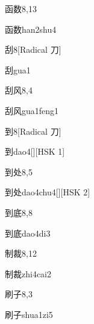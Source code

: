 \begin{entry}{函数}{8,13}
  \begin{phonetics}{函数}{han2shu4}
  \end{phonetics}
\end{entry}

\begin{entry}{刮}{8}[Radical 刀]
  \begin{phonetics}{刮}{gua1}
  \end{phonetics}
\end{entry}

\begin{entry}{刮风}{8,4}
  \begin{phonetics}{刮风}{gua1feng1}
  \end{phonetics}
\end{entry}

\begin{entry}{到}{8}[Radical 刀]
  \begin{phonetics}{到}{dao4}[][HSK 1]
  \end{phonetics}
\end{entry}

\begin{entry}{到处}{8,5}
  \begin{phonetics}{到处}{dao4chu4}[][HSK 2]
  \end{phonetics}
\end{entry}

\begin{entry}{到底}{8,8}
  \begin{phonetics}{到底}{dao4di3}
  \end{phonetics}
\end{entry}

\begin{entry}{制裁}{8,12}
  \begin{phonetics}{制裁}{zhi4cai2}
  \end{phonetics}
\end{entry}

\begin{entry}{刷子}{8,3}
  \begin{phonetics}{刷子}{shua1zi5}
  \end{phonetics}
\end{entry}

